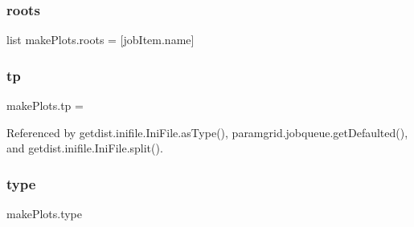\mbox{\label{namespacemakePlots_aa535eb36e332d0cec6f90fa308a42c52}} 
\subsubsection{\texorpdfstring{roots}{roots}}
{\footnotesize\ttfamily list make\+Plots.\+roots = \mbox{[}job\+Item.\+name\mbox{]}}

\mbox{\label{namespacemakePlots_a374a7cc6f2ae895a5c2912c5b9307d89}} 
\subsubsection{\texorpdfstring{tp}{tp}}
{\footnotesize\ttfamily make\+Plots.\+tp = \textquotesingle{}\textquotesingle{}}



Referenced by getdist.\+inifile.\+Ini\+File.\+as\+Type(), paramgrid.\+jobqueue.\+get\+Defaulted(), and getdist.\+inifile.\+Ini\+File.\+split().

\mbox{\label{namespacemakePlots_a174e217cb2f1b697784d34498aa61167}} 
\subsubsection{\texorpdfstring{type}{type}}
{\footnotesize\ttfamily make\+Plots.\+type}

